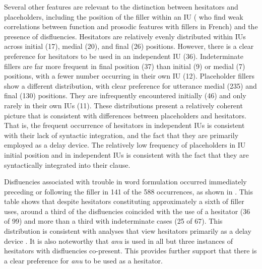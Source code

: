 \documentclass[output=paper,
\ChapterDOI{10.5281/zenodo.15697583}
colorlinks,
citecolor=brown]{langscibook}
\begin{document}
Several other features are relevant to the distinction between hesitators and placeholders, including the position of the filler within an IU (\cite[see e.g.,][]{hennecke2022placeholder} who find weak correlations between function and prosodic features with fillers in French) and the presence of disfluencies. Hesitators are relatively evenly distributed within IUs across initial (17), medial (20), and final (26) positions. However, there is a clear preference for hesitators to be used in an independent IU (36). Indeterminate fillers are far more frequent in final position (37) than initial (9) or medial (7) positions, with a fewer number occurring in their own IU (12). Placeholder fillers show a different distribution, with clear preference for utterance medial (235) and final (130) positions. They are infrequently encountered initially (46) and only rarely in their own IUs (11). These distributions present a relatively coherent picture that is consistent with differences between placeholders and hesitators. That is, the frequent occurrence of hesitators in independent IUs is consistent with their lack of syntactic integration, and the fact that they are primarily employed as a delay device. The relatively low frequency of placeholders in IU initial position and in independent IUs is consistent with the fact that they are syntactically integrated into their clause.


Disfluencies associated with trouble in word formulation occurred immediately preceding or following the filler in 141 of the 588 occurrences, as shown in . This table shows that despite hesitators constituting approximately a sixth of filler uses, around a third of the disfluencies coincided with the use of a hesitator (36 of 99) and more than a third with indeterminate cases (25 of 67). This distribution is consistent with analyses that view hesitators primarily as a delay device \citep{clark2002using}. It is also noteworthy that \textit{anu} is used in all but three instances of hesitators with disfluencies co-present. This provides further support that there is a clear preference for \textit{anu} to be used as a hesitator.
\end{document}
